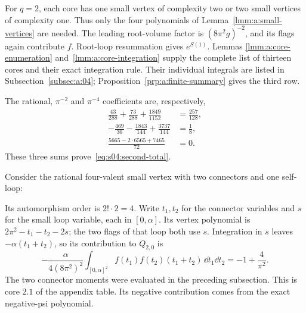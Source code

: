 \begin{prf}
For $q=2$, each core has one small vertex of complexity two or two
small vertices of complexity one. Thus only the four polynomials of
Lemma~\ref{lmm:a:small-vertices} are needed. The leading root-volume
factor is $(8\pi^2g)^{-2}$, and its flags again contribute $f$.
Root-loop resummation gives $e^{S(1)}$. Lemmas
\ref{lmm:a:core-enumeration} and~\ref{lmm:a:core-integration} supply
the complete list of thirteen cores and their exact integration rule.
Their individual integrals are listed in Subsection~\ref{subsec:a:04};
Proposition~\ref{prp:a:finite-summary} gives the third row.

The rational, $\pi^{-2}$ and $\pi^{-4}$ coefficients are, respectively,
\begin{align*}
 \frac{43}{288}+\frac{73}{288}+\frac{1849}{1152}
   &=\frac{257}{128},\\
 -\frac{469}{36}-\frac{1843}{144}+\frac{3737}{144}
   &=\frac18,\\
 \frac{5665-2\cdot6565+7465}{72}&=0.
\end{align*}
These three sums prove~\eqref{eq:s04:second-total}.
\end{prf}

\begin{exm}
Consider the rational four-valent small vertex with two connectors
and one self-loop:
\begin{center}
\end{center}
Its automorphism order is $2!\cdot2=4$. Write $t_1,t_2$ for the
connector variables and $s$ for the small loop variable, each in
$[0,\alpha]$. Its vertex polynomial is
$2\pi^2-t_1-t_2-2s$; the two flags of that loop both use $s$.
Integration in $s$ leaves $-\alpha(t_1+t_2)$, so its contribution
to $Q_{2,0}$ is
\begin{equation}\label{eq:s04:q-two-example}
 -\frac{\alpha}{4(8\pi^2)^2}\int_{[0,\alpha]^2}
 f(t_1)f(t_2)(t_1+t_2)\,\dd t_1\dd t_2
 =-1+\frac4{\pi^2}.
\end{equation}
The two connector moments were evaluated in the preceding subsection.
This is core $2.1$ of the appendix table. Its negative contribution
comes from the exact negative-psi polynomial.
\end{exm}

